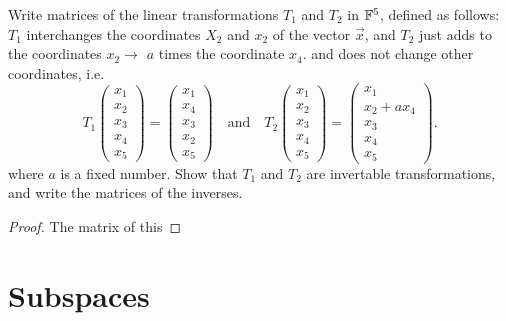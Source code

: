 \documentclass{article}
\begin{document}
\begin{exercise}
  Write matrices of the linear transformations $T_1$ and $T_2$ in $\F^5$,
  defined as follows: $T_1$ interchanges the coordinates $X_2$ and $x_2$
  of the vector $\vec{x}$, and $T_2$ just adds to the coordinates 
  $x_2\to$
  $a$ times the coordinate $x_4$. and does not change other coordinates, i.e.
  \[
    T_1
    \begin{pmatrix}
      x_1\\x_2\\x_3\\x_4\\x_5
    \end{pmatrix}=
    \begin{pmatrix}
      x_1\\x_4\\x_3\\x_2\\x_5
    \end{pmatrix}
    \quad\text{and}\quad
    T_2
    \begin{pmatrix}
      x_1\\x_2\\x_3\\x_4\\x_5
    \end{pmatrix}=
    \begin{pmatrix}
      x_1\\x_2+ax_4\\x_3\\x_4\\x_5
    \end{pmatrix}.
  \]
  where $a$ is a fixed number.
  Show that $T_1$ and $T_2$ are invertable transformations, and write
  the matrices of the inverses.
\end{exercise}
\begin{proof}
  The matrix of this 
\end{proof}



\section{Subspaces}
\end{document}
